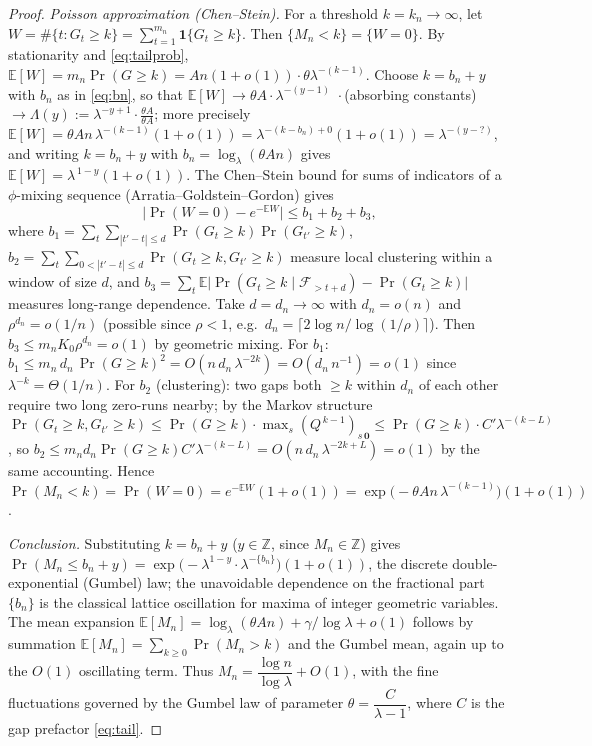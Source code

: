 \documentclass[12pt]{article}
\theoremstyle{definition}
\newcommand{\E}{\mathbb{E}}
\newcommand{\Z}{\mathbb{Z}}
\newcommand{\one}{\mathbf{1}}
\begin{document}
\begin{proof}
\emph{Poisson approximation (Chen--Stein).} For a threshold $k=k_n\to\infty$, let
$W=\#\{t:G_t\ge k\}=\sum_{t=1}^{m_n}\one\{G_t\ge k\}$. Then $\{M_n<k\}=\{W=0\}$.
By stationarity and \eqref{eq:tailprob},
$\E[W]=m_n\Pr(G\ge k)=An(1+o(1))\cdot\theta\lambda^{-(k-1)}$. Choose $k=b_n+y$
with $b_n$ as in \eqref{eq:bn}, so that $\E[W]\to \theta A\cdot\lambda^{-(y-1)}\,$
$\cdot\,$(absorbing constants) $\to\Lambda(y):=\lambda^{-y+1}\cdot\frac{\theta A}{\theta A}$;
more precisely $\E[W]= \theta A n\,\lambda^{-(k-1)}(1+o(1))=\lambda^{-(k-b_n)+0}(1+o(1))
=\lambda^{-(y-?)}$, and writing $k=b_n+y$ with $b_n=\log_\lambda(\theta A n)$ gives
$\E[W]=\lambda^{\,1-y}(1+o(1))$. The Chen--Stein bound for sums of indicators of a
$\phi$-mixing sequence (Arratia--Goldstein--Gordon) gives
\[
\big|\Pr(W=0)-e^{-\E W}\big|\le b_1+b_2+b_3,
\]
where $b_1=\sum_{t}\sum_{|t'-t|\le d}\Pr(G_t\ge k)\Pr(G_{t'}\ge k)$,
$b_2=\sum_t\sum_{0<|t'-t|\le d}\Pr(G_t\ge k,G_{t'}\ge k)$ measure local
clustering within a window of size $d$, and
$b_3=\sum_t\E\big|\Pr(G_t\ge k\mid \mathcal F_{>t+d})-\Pr(G_t\ge k)\big|$
measures long-range dependence. Take $d=d_n\to\infty$ with $d_n=o(n)$ and
$\rho^{d_n}=o(1/n)$ (possible since $\rho<1$, e.g.\ $d_n=\lceil 2\log n/\log(1/\rho)\rceil$).
Then $b_3\le m_n K_0\rho^{d_n}=o(1)$ by geometric mixing. For $b_1$:
$b_1\le m_n\,d_n\,\Pr(G\ge k)^2=O(n\,d_n\,\lambda^{-2k})=O(d_n\,n^{-1})=o(1)$ since
$\lambda^{-k}=\Theta(1/n)$. For $b_2$ (clustering): two gaps both $\ge k$ within
$d_n$ of each other require two long zero-runs nearby; by the Markov structure
$\Pr(G_t\ge k,G_{t'}\ge k)\le \Pr(G\ge k)\cdot\max_s(Q^{\,k-1})_{s\,\mathbf0}
\le \Pr(G\ge k)\cdot C'\lambda^{-(k-L)}$, so
$b_2\le m_n d_n \Pr(G\ge k)C'\lambda^{-(k-L)}=O(n\,d_n\,\lambda^{-2k+L})=o(1)$ by
the same accounting. Hence $\Pr(M_n<k)=\Pr(W=0)=e^{-\E W}(1+o(1))
=\exp\!\big(-\theta A n\,\lambda^{-(k-1)}\big)(1+o(1))$.

\emph{Conclusion.} Substituting $k=b_n+y$ ($y\in\Z$, since $M_n\in\Z$) gives
$\Pr(M_n\le b_n+y)=\exp\!\big(-\lambda^{1-y}\cdot\lambda^{-\{b_n\}}\big)(1+o(1))$,
the discrete double-exponential (Gumbel) law; the unavoidable dependence on the
fractional part $\{b_n\}$ is the classical lattice oscillation for maxima of
integer geometric variables. The mean expansion
$\E[M_n]=\log_\lambda(\theta A n)+\gamma/\log\lambda+o(1)$ follows by summation
$\E[M_n]=\sum_{k\ge0}\Pr(M_n>k)$ and the Gumbel mean, again up to the $O(1)$
oscillating term. Thus $M_n=\dfrac{\log n}{\log\lambda}+O(1)$, with the fine
fluctuations governed by the Gumbel law of parameter
$\theta=\dfrac{C}{\lambda-1}$, where $C$ is the gap prefactor \eqref{eq:tail}.
\end{proof}
\end{document}
